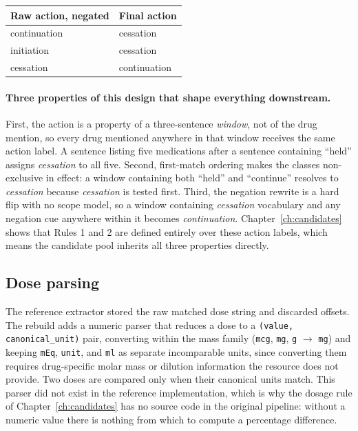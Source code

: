 \begin{center}
\begin{tabular}{ll}
\toprule
\textbf{Raw action, negated} & \textbf{Final action} \\
\midrule
continuation & cessation \\
initiation   & cessation \\
cessation    & continuation \\
\bottomrule
\end{tabular}
\end{center}

\paragraph{Three properties of this design that shape everything downstream.}
First, the action is a property of a three-sentence \emph{window}, not of the
drug mention, so every drug mentioned anywhere in that window receives the same
action label. A sentence listing five medications after a sentence containing
``held'' assigns \emph{cessation} to all five. Second, first-match ordering
makes the classes non-exclusive in effect: a window containing both ``held'' and
``continue'' resolves to \emph{cessation} because \emph{cessation} is tested
first. Third, the negation rewrite is a hard flip with no scope model, so a
window containing \emph{cessation} vocabulary and any negation cue anywhere
within it becomes \emph{continuation}. Chapter~\ref{ch:candidates} shows that
Rules 1 and 2 are defined entirely over these action labels, which means the
candidate pool inherits all three properties directly.

\subsection{Dose parsing}

The reference extractor stored the raw matched dose string and discarded
offsets. The rebuild adds a numeric parser that reduces a dose to a
\texttt{(value, canonical\_unit)} pair, converting within the mass family
(\texttt{mcg}, \texttt{mg}, \texttt{g} $\rightarrow$ \texttt{mg}) and keeping
\texttt{mEq}, \texttt{unit}, and \texttt{ml} as separate incomparable units,
since converting them requires drug-specific molar mass or dilution information
the resource does not provide. Two doses are compared only when their canonical
units match. This parser did not exist in the reference implementation, which is
why the dosage rule of Chapter~\ref{ch:candidates} has no source code in the
original pipeline: without a numeric value there is nothing from which to
compute a percentage difference.


